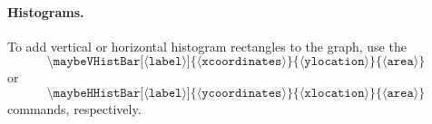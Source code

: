 \documentclass{article}
\newcommand{\command}[1]{\texttt{\textbackslash #1}}
\newcommand{\param}[1]{$\langle${#1}$\rangle$}
\begin{document}
\paragraph*{Histograms.}
To add vertical or horizontal histogram rectangles to the graph, use the
\[
    \command{maybeVHistBar[\param{label}]\{\param{xcoordinates}\}\{\param{ylocation}\}\{\param{area}\}}
\]
or
\[
    \command{maybeHHistBar[\param{label}]\{\param{ycoordinates}\}\{\param{xlocation}\}\{\param{area}\}}
\]
commands, respectively.
\begin{center}
    \\
\end{center}
\end{document}
